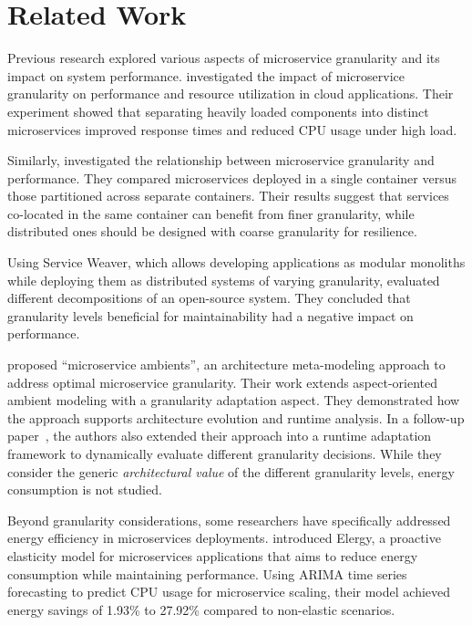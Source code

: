\section{Related Work}
Previous research explored various aspects of microservice granularity and its impact on system performance.
\citet{mustafa2017optimizing} investigated the impact of microservice granularity on performance and resource utilization in cloud applications.
Their experiment showed that separating heavily loaded components into distinct microservices improved response times and reduced CPU usage under high load.

Similarly, \citet{10.1145/3147234.3148093} investigated the relationship between microservice granularity and performance.
They compared microservices deployed in a single container versus those partitioned across separate containers.
Their results suggest that services co-located in the same container can benefit from finer granularity, while distributed ones should be designed with coarse granularity for resilience.

Using Service Weaver, which allows developing applications as modular monoliths while deploying them as distributed systems of varying granularity, \citet{galster_performance_2024} evaluated different decompositions of an open-source system.
They concluded that granularity levels beneficial for maintainability had a negative impact on performance.

\citet{7930193} proposed \enquote{microservice ambients}, an architecture meta-modeling approach to address optimal microservice granularity.
Their work extends aspect-oriented ambient modeling with a granularity adaptation aspect.
They demonstrated how the approach supports architecture evolution and runtime analysis.
In a follow-up paper~\cite{hassan_dynamic_2021}, the authors also extended their approach into a runtime adaptation framework to dynamically evaluate different granularity decisions.
While they consider the generic \textit{architectural value} of the different granularity levels, energy consumption is not studied.

Beyond granularity considerations, some researchers have specifically addressed energy efficiency in microservices deployments.
\citet{de2021revisiting} introduced Elergy, a proactive elasticity model for microservices applications that aims to reduce energy consumption while maintaining performance.
Using ARIMA time series forecasting to predict CPU usage for microservice scaling, their model achieved energy savings of 1.93\% to 27.92\% compared to non-elastic scenarios.

